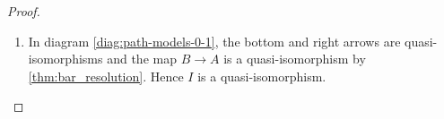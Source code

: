 \documentclass{scrartcl}
\theoremstyle{plain}
\theoremstyle{definition}
\renewcommand{\epsilon}{\varepsilon}
\newcommand{\eqdef}{\eqqcolon}
\DeclareMathOperator{\id}{id}
\DeclareMathOperator{\Sh}{Sh}
\DeclareMathOperator{\sgn}{sgn}
\newcommand{\comp}{\mathbin{\circ}}
\begin{document}
\begin{proof}
\begin{enumerate}
\item In diagram \ref{diag:path-models-0-1}, the bottom and right arrows are quasi-isomorphisms and the map $B\to A$ is a quasi-isomorphism by \cref{thm:bar_resolution}. Hence $I$ is a quasi-isomorphism.
\end{enumerate}
\end{proof}



\end{document}
